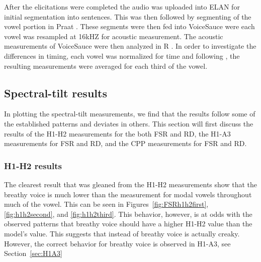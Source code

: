 \documentclass[12pt, letterpaper]{article}
\begin{document}
After the elicitations were completed the audio was uploaded into ELAN \citep{wittenburgELANProfessionalFramework2006} for initial segmentation into sentences. This was then followed by segmenting of the vowel portion in Praat \citep{boersmaPraatDoingPhonetics2021}. These segments were then fed into VoiceSauce \citep{shueVOICESAUCEProgramVoice2009} were each vowel was resampled at 16kHZ for acoustic measurement. The acoustic measurements of VoiceSauce were then analyzed in R \citep{rcoreteamLanguageEnvironmentStatistical2021}. In order to investigate the differences in timing, each vowel was normalized for time and following \citet{garellekAcousticConsequencesPhonation2011}, the resulting measurements were averaged for each third of the vowel. 

\subsection{Spectral-tilt results} \label{sec:Results}

In plotting the spectral-tilt measurements, we find that the results follow some of the established patterns and deviates in others. This section will first discuss the results of the H1-H2 measurements for the both FSR and RD, the H1-A3 measurements for FSR and RD, and the CPP measurements for FSR and RD. 

\subsubsection{H1-H2 results} \label{sec:H1H2}

The clearest result that was gleaned from the H1-H2 measurements show that the breathy voice is much lower than the measurement for modal vowels throughout much of the vowel. This can be seen in Figures~\ref{fig:FSRh1h2first}, \ref{fig:h1h2second}, and \ref{fig:h1h2third}. This behavior, however, is at odds with the observed patterns that breathy voice should have a higher H1-H2 value than the model's value. This suggests that instead of breathy voice is actually creaky. However, the correct behavior for breathy voice is observed in H1-A3, see Section~\ref{sec:H1A3}
\end{document}
